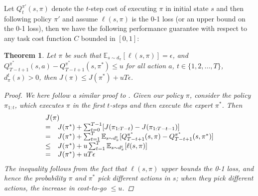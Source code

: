 \documentclass[twoside]{article}
\newtheorem{theorem}{Theorem}[section]
\newcommand{\todo}[1]{\textcolor{red}{[To do: #1]}\index[todo]{#1}}
\begin{document}
Let $Q^{\pi'}_t(s,\pi)$ denote the $t$-step cost of executing $\pi$ in initial state $s$ and then following policy $\pi'$ and assume $\ell(s,\pi)$ is the 0-1 loss (or an upper bound on the 0-1 loss), then we have the following performance guarantee with respect to any task cost function $C$ bounded in $[0,1]$:
\begin{theorem} \label{thmforward}
Let $\pi$ be such that $\mathbb{E}_{s \sim d_{\pi}}[\ell(s,\pi)] = \epsilon$, and $Q^{\pi^*}_{T-t+1}(s,a) - Q^{\pi^*}_{T-t+1}(s,\pi^*) \leq u$ for all action $a$, $t \in \{1,2,\dots,T\}$, $d^{t}_\pi(s) > 0$, then $J(\pi) \leq J(\pi^*) + u T \epsilon$.
\begin{proof}
We here follow a similar proof to \citet{Ross10}. Given our policy $\pi$, consider the policy $\pi_{1:t}$, which executes $\pi$ in the first $t$-steps and then execute the expert $\pi^*$. Then
\begin{displaymath}
\begin{array}{rl}
\multicolumn{2}{l}{J(\pi)}\\
= & J(\pi^*) + \sum_{t=0}^{T-1} [J(\pi_{1:T-t}) - J(\pi_{1:T-t-1})]\\
= & J(\pi^*) + \sum_{t=1}^{T} \mathbb{E}_{s \sim d^t_\pi}[Q^{\pi^*}_{T-t+1}(s,\pi) - Q^{\pi^*}_{T-t+1}(s,\pi^*)]\\
\leq & J(\pi^*) + u \sum_{t=1}^{T} \mathbb{E}_{s \sim d^t_\pi}[\ell(s,\pi)]\\
= & J(\pi^*) + u T \epsilon\\
\end{array}
\end{displaymath}
The inequality follows from the fact that $\ell(s,\pi)$ upper bounds the 0-1 loss, and hence the probability $\pi$ and $\pi^*$ pick different actions in $s$; when they pick different actions, the increase in cost-to-go $\leq u$.
\end{proof}
\end{theorem}
%
%
\end{document}
